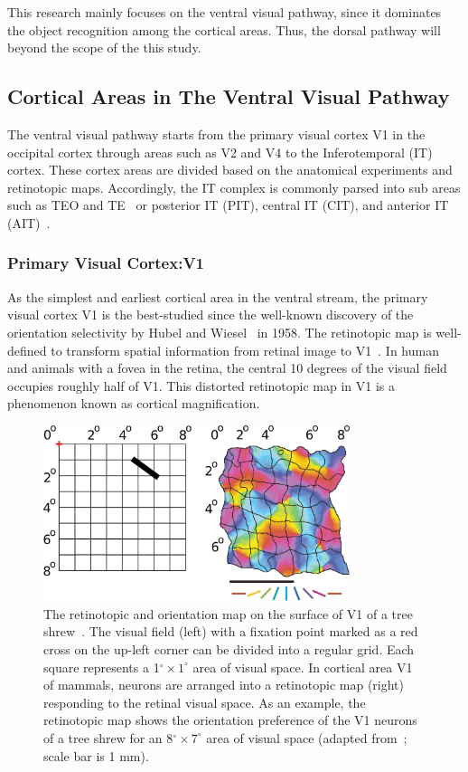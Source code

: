 This research mainly focuses on the ventral visual pathway, since it dominates the object recognition among the cortical areas.
Thus, the dorsal pathway will beyond the scope of the this study. 


\subsection{Cortical Areas in The Ventral Visual Pathway}
The ventral visual pathway starts from the primary visual cortex V1 in the occipital cortex through areas such as V2 and V4 to the Inferotemporal (IT) cortex.
These cortex areas are divided based on the anatomical experiments and retinotopic maps.
Accordingly, the IT complex is commonly parsed into sub areas such as TEO and TE~\cite{janssen2000selectivity,von1947neocortex} or posterior IT (PIT), central IT (CIT), and anterior IT (AIT)~\cite{felleman1991distributed}.
\subsubsection{Primary Visual Cortex:V1}
As the simplest and earliest cortical area in the ventral stream, the primary visual cortex V1 is the best-studied since the well-known discovery of the orientation selectivity by Hubel and Wiesel~\cite{hubel1959receptive} in 1958.
The retinotopic map is well-defined to transform spatial information from retinal image to V1~\cite{tootell1982deoxyglucose}.
In human and animals with a fovea in the retina, the central 10 degrees of the visual field occupies roughly half of V1.
This distorted retinotopic map in V1 is a phenomenon known as cortical magnification.

\begin{figure}
	\centering
	\includegraphics[width=0.8\textwidth]{pics/retinotopic.jpg}
	\caption{The retinotopic and orientation map on the surface of V1 of a tree shrew~\cite{bednar2009topographica}.
	The visual field (left) with a fixation point marked as a red cross on the up-left corner can be divided into a regular grid.
	Each square represents a 1$^\circ \times 1^\circ$ area of visual space.
	In cortical area V1 of mammals, neurons are arranged into a retinotopic map (right) responding to the retinal visual space.
	As an example, the retinotopic map shows the orientation preference of the V1 neurons of a tree shrew for an 8$^\circ \times 7^\circ$ area of visual space (adapted from~\cite{bosking2002spatial}; scale bar is 1 mm).}
	\label{Fig:retinotopic}
\end{figure}

